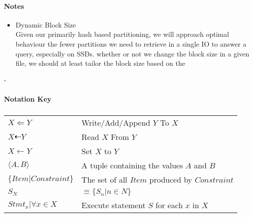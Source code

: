 \documentclass[fleqn]{article}
\begin{document}
\paragraph{Notes}
\begin{itemize}
  \item Dynamic Block Size\\[2pt]
    Given our primarily hash based partitioning, we will approach optimal behaviour the
    fewer partitions we need to retrieve in a single IO to answer a query, especially on SSDs. 
    whether or not we change the block size in a given file, we should at least tailor 
    the block size based on the 
\end{itemize}
  - 

\paragraph{Notation Key}
\subparagraph{}
\begin{tabular}{l l}
$X \Leftarrow Y$ & Write/Add/Append $Y$ To $X$\\
$X \dashleftarrow Y$ & Read $X$ From $Y$\\
$X \gets Y$ & Set $X$ to $Y$\\
$\langle A,B \rangle$ & A tuple containing the values $A$ and $B$\\
$\{Item | Constraint\}$ & The set of all $Item$ produced by $Constraint$\\
$S_N$ & $\equiv \{S_n | n \in N\}$\\
$Stmt_x | \forall x \in X$ & Execute statement $S$ for each $x$ in $X$\\
\end{tabular}
\end{document}
